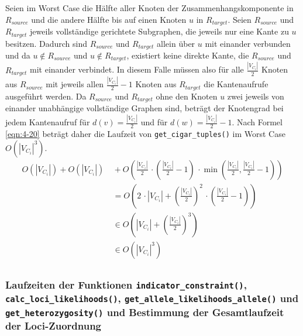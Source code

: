 Seien im Worst Case die Hälfte aller Knoten der Zusammenhangskomponente in $ R_{source} $ und die andere Hälfte bis auf einen Knoten $u$ in $ R_{target} $. Seien $ R_{source} $ und $ R_{target} $ jeweils vollständige gerichtete Subgraphen, die jeweils nur eine Kante zu $u$ besitzen. Dadurch sind $ R_{source} $ und $ R_{target} $ allein über $u$ mit einander verbunden und da $u \notin R_{source}$ und $u \notin R_{target}$, existiert keine direkte Kante, die $ R_{source} $ und $ R_{target} $ mit einander verbindet. In diesem Falle müssen also für alle $\frac{|V_{C_{i}}|}{2}$ Knoten aus $ R_{source} $ mit jeweils allen $\frac{|V_{C_{i}}|}{2}-1$ Knoten aus $R_{target}$ die Kantenaufrufe ausgeführt werden. Da $ R_{source} $ und $ R_{target} $ ohne den Knoten $u$ zwei jeweils von einander unabhängige vollständige Graphen sind, beträgt der Knotengrad bei jedem Kantenaufruf für $d(v) = \frac{|V_{C_{i}}|}{2}$ und für $d(w) = \frac{|V_{C_{i}}|}{2} -1$. Nach Formel \eqref{eqn:4-20} beträgt daher die Laufzeit von \lstinline|get_cigar_tuples()| im Worst Case $O(|V_{C_{i}}|^3)$. \\

\begin{equation} \label{eqn:4-20}
\tag{4-20}
\begin{aligned}
 O(|V_{C_{i}}|) + O(|V_{C_{i}}|) &\ {} + O\left( \frac{|V_{C_{i}}|}{2} \, \cdotp \left( \frac{|V_{C_{i}}|}{2} - 1\right) \, \cdotp \min \left(\frac{|V_{C_{i}}|}{2}, \frac{|V_{C_{i}}|}{2} -1 \right)   \right)   \\
& \ = O\left(2  \, \cdotp |V_{C_{i}}| +  \left( \frac{|V_{C_{i}}|}{2}\right)^2 \, \cdotp \left( \frac{|V_{C_{i}}|}{2} - 1\right) \right) \\
&\ \in O\left(|V_{C_{i}}| + \left( \frac{|V_{C_{i}}|}{2}\right)^3 \right)  \\
&\ \in O(|V_{C_{i}}|^3) \\
\end{aligned}
\end{equation}

\subsubsection{Laufzeiten der Funktionen \lstinline|indicator_constraint()|, \lstinline|calc_loci_likelihoods()|, \linebreak \lstinline|get_allele_likelihoods_allele()| und \lstinline|get_heterozygosity()| und Bestimmung der Gesamtlaufzeit der Loci-Zuordnung} \label{subsubsec:compl_loci_lh}

